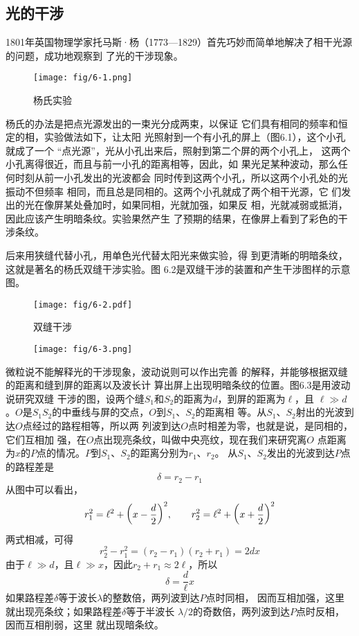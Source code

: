\subsection{光的干涉}

1801年英国物理学家托马斯·杨（1773—1829）首先巧妙而简单地解决了相干光源的问题，成功地观察到
了光的干涉现象。
\begin{figure}[htp]\centering
    \texttt{[image: fig/6-1.png]}
    \caption{杨氏实验}
    \end{figure}

杨氏的办法是把点光源发出的一束光分成两束，以保证
它们具有相同的频率和恒定的相，实验做法如下，让太阳
光照射到一个有小孔的屏上（图6.1），这个小孔就成了一个
“点光源”，光从小孔出来后，照射到第二个屏的两个小孔上，
这两个小孔离得很近，而且与前一小孔的距离相等，因此，如
果光足某种波动，那么任何时刻从前一小孔发出的光波都会
同时传到这两个小孔，所以这两个小孔处的光振动不但频率
相同，而且总是同相的。这两个小孔就成了两个相干光源，它
们发出的光在像屏某处叠加时，如果同相，光就加强，如果反
相，光就减弱或抵消，因此应该产生明暗条纹。实验果然产生
了预期的结果，在像屏上看到了彩色的干涉条纹。

后来用狭缝代替小孔，用单色光代替太阳光来做实验，得
到更清晰的明暗条纹，这就是著名的杨氏双缝干涉实验。图
6.2是双缝干涉的装置和产生干涉图样的示意图。
\begin{figure}[htp]\centering
    \texttt{[image: fig/6-2.pdf]}
    \caption{双缝干涉}
    \end{figure}

    \begin{figure}[htp]\centering
\texttt{[image: fig/6-3.png]}
\caption{}
\end{figure}
微粒说不能解释光的干涉现象，波动说则可以作出完善
的解释，并能够根据双缝的距离和缝到屏的距离以及波长计
算出屏上出现明暗条纹的位置。图6.3是用波动说研究双缝
干涉的图，设两个缝$S_1$和$S_2$的距离为$d$，到屏的距离为$\ell$，且
$\ell\gg d$。$O$是$S_1S_2$的中垂线与屏的交点，$O$到$S_1$、$S_2$的距离相
等。从$S_1$、$S_2$射出的光波到达$O$点经过的路程相等，所以两
列波到达$O$点时相差为零，也就是说，是同相的，它们互相加
强，在$O$点出现亮条纹，叫做中央亮纹，现在我们来研究离$O$
点距离为$x$的$P$点的情况。$P$到$S_1$、$S_2$的距离分别为$r_1$、$r_2$。
从$S_1$、$S_2$发出的光波到达$P$点的路程差是
\[\delta =r_2-r_1 \]
从图中可以看出，
\[r^2_1=\ell^2+\qty(x-\frac{d}{2})^2,\qquad r^2_2=\ell^2+\qty(x+\frac{d}{2})^2  \]
两式相减，可得
\[r^2_2-r^2_1=(r_2-r_1)(r_2+r_1)=2dx\]
由于$\ell\gg d$，且$\ell\gg x$，因此$r_2+r_1\approx 2\ell$，所以
\[\delta=\frac{d}{\ell}x \]
如果路程差$\delta$等于波长$\lambda$的整数倍，两列波到达$P$点时同相，
因而互相加强，这里就出现亮条纹；如果路程差$\delta$等于半波长
$\lambda/2$的奇数倍，两列波到达$P$点时反相，因而互相削弱，这里
就出现暗条纹。

